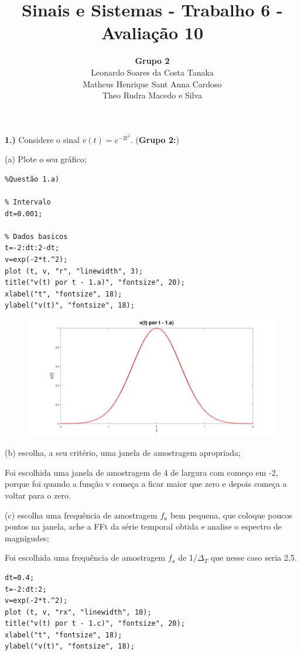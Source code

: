 \documentclass[10pt]{article}
\title{Sinais e Sistemas - Trabalho 6 - Avaliação 10}
\author{
    \textbf{Grupo 2}\\
    Leonardo Soares da Costa Tanaka\\
    Matheus Henrique Sant Anna Cardoso\\
    Theo Rudra Macedo e Silva
}
\date{}
\begin{document}
\maketitle
\thispagestyle{capa}
\newpage

\textbf{1.)} Considere o sinal $v(t) = e^{-2t^2}$. (\textbf{Grupo 2:})

(a) Plote o seu gráfico;

\begin{verbatim}
%Questão 1.a)

% Intervalo
dt=0.001;

% Dados basicos
t=-2:dt:2-dt;
v=exp(-2*t.^2);
plot (t, v, "r", "linewidth", 3);
title("v(t) por t - 1.a)", "fontsize", 20);
xlabel("t", "fontsize", 18);
ylabel("v(t)", "fontsize", 18);
\end{verbatim}

\begin{figure}[h]
    \includegraphics[scale=0.2]{questao1a}
    \centering
\end{figure}

(b) escolha, a seu critério, uma janela de amostragem apropriada;

\vspace{\baselineskip}
Foi escolhida uma janela de amostragem de 4 de largura com começo em -2, porque foi quando a função v começa a ficar maior que zero e depois começa a voltar para o zero.
\vspace{\baselineskip}

(c) escolha uma frequência de amostragem $f_a$ bem pequena, que coloque poucos pontos na janela, ache a FFt da série temporal obtida e analise o espectro de magnigudes;

\vspace{\baselineskip}
Foi escolhida uma frequência de amostragem $f_a$ de 1/$\Delta_T$ que nesse caso seria 2,5.

\begin{verbatim}
dt=0.4;
t=-2:dt:2;
v=exp(-2*t.^2);
plot (t, v, "rx", "linewidth", 10);
title("v(t) por t - 1.c)", "fontsize", 20);
xlabel("t", "fontsize", 18);
ylabel("v(t)", "fontsize", 18);
\end{verbatim}
\end{document}
